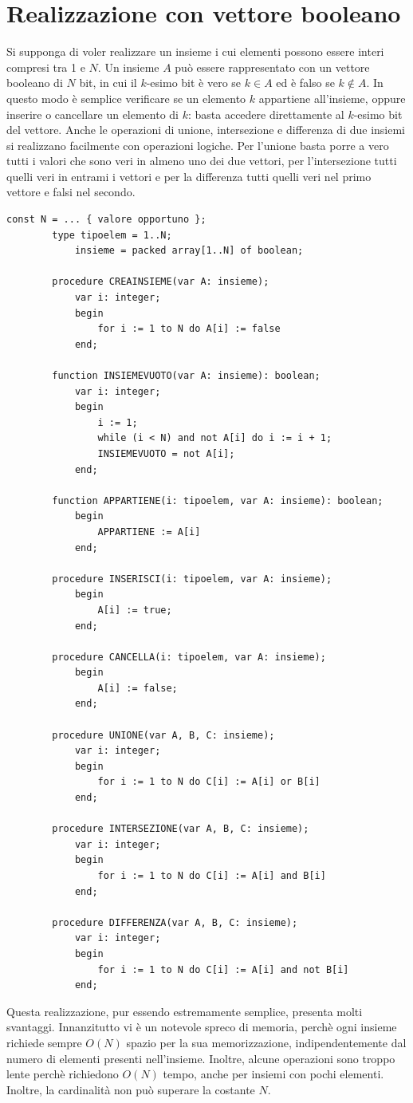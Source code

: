 \documentclass[12pt]{report}
\begin{document}
	\section{Realizzazione con vettore booleano}
	Si supponga di voler realizzare un insieme i cui elementi possono essere interi compresi tra 1 e $N$. Un insieme $A$ può essere rappresentato con un vettore booleano di $N$ bit, in cui il $k$-esimo bit è vero se $k \in A$ ed è falso se $k \notin A$. In questo modo è semplice verificare se un elemento $k$ appartiene all'insieme, oppure inserire o cancellare un elemento di $k$: basta accedere direttamente al $k$-esimo bit del vettore. Anche le operazioni di unione, intersezione e differenza di due insiemi si realizzano facilmente con operazioni logiche. Per l'unione basta porre a vero tutti i valori che sono veri in almeno uno dei due vettori, per l'intersezione tutti quelli veri in entrami i vettori e per la differenza tutti quelli veri nel primo vettore e falsi nel secondo.
	\begin{lstlisting}[style=pascalstyle]
		const N = ... { valore opportuno };
		type tipoelem = 1..N;
			insieme = packed array[1..N] of boolean;

		procedure CREAINSIEME(var A: insieme);
			var i: integer;
			begin
				for i := 1 to N do A[i] := false
			end;

		function INSIEMEVUOTO(var A: insieme): boolean;
			var i: integer;
			begin
				i := 1;
				while (i < N) and not A[i] do i := i + 1;
				INSIEMEVUOTO = not A[i];
			end;

		function APPARTIENE(i: tipoelem, var A: insieme): boolean;
			begin
				APPARTIENE := A[i]
			end;

		procedure INSERISCI(i: tipoelem, var A: insieme);
			begin
				A[i] := true;
			end;

		procedure CANCELLA(i: tipoelem, var A: insieme);
			begin
				A[i] := false;
			end;

		procedure UNIONE(var A, B, C: insieme);
			var i: integer;
			begin
				for i := 1 to N do C[i] := A[i] or B[i]
			end;

		procedure INTERSEZIONE(var A, B, C: insieme);
			var i: integer;
			begin
				for i := 1 to N do C[i] := A[i] and B[i]
			end;

		procedure DIFFERENZA(var A, B, C: insieme);
			var i: integer;
			begin
				for i := 1 to N do C[i] := A[i] and not B[i]
			end;
	\end{lstlisting}
	Questa realizzazione, pur essendo estremamente semplice, presenta molti svantaggi. Innanzitutto vi è un notevole spreco di memoria, perchè ogni insieme richiede sempre $O(N)$ spazio per la sua memorizzazione, indipendentemente dal numero di elementi presenti nell'insieme. Inoltre, alcune operazioni sono troppo lente perchè richiedono $O(N)$ tempo, anche per insiemi con pochi elementi. Inoltre, la cardinalità non può superare la costante $N$.
\end{document}
